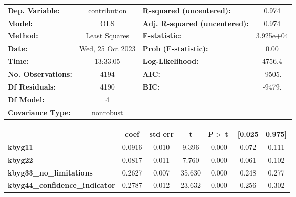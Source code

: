 \begin{center}
\begin{tabular}{lclc}
\toprule
\textbf{Dep. Variable:}                &   contribution   & \textbf{  R-squared (uncentered):}      &     0.974   \\
\textbf{Model:}                        &       OLS        & \textbf{  Adj. R-squared (uncentered):} &     0.974   \\
\textbf{Method:}                       &  Least Squares   & \textbf{  F-statistic:       }          & 3.925e+04   \\
\textbf{Date:}                         & Wed, 25 Oct 2023 & \textbf{  Prob (F-statistic):}          &     0.00    \\
\textbf{Time:}                         &     13:33:05     & \textbf{  Log-Likelihood:    }          &    4756.4   \\
\textbf{No. Observations:}             &        4194      & \textbf{  AIC:               }          &    -9505.   \\
\textbf{Df Residuals:}                 &        4190      & \textbf{  BIC:               }          &    -9479.   \\
\textbf{Df Model:}                     &           4      & \textbf{                     }          &             \\
\textbf{Covariance Type:}              &    nonrobust     & \textbf{                     }          &             \\
\bottomrule
\end{tabular}
\begin{tabular}{lcccccc}
                                       & \textbf{coef} & \textbf{std err} & \textbf{t} & \textbf{P$> |$t$|$} & \textbf{[0.025} & \textbf{0.975]}  \\
\midrule
\textbf{kbyg11}                        &       0.0916  &        0.010     &     9.396  &         0.000        &        0.072    &        0.111     \\
\textbf{kbyg22}                        &       0.0817  &        0.011     &     7.760  &         0.000        &        0.061    &        0.102     \\
\textbf{kbyg33\_no\_limitations}       &       0.2627  &        0.007     &    35.630  &         0.000        &        0.248    &        0.277     \\
\textbf{kbyg44\_confidence\_indicator} &       0.2787  &        0.012     &    23.632  &         0.000        &        0.256    &        0.302     \\

\end{tabular}
\end{center}

